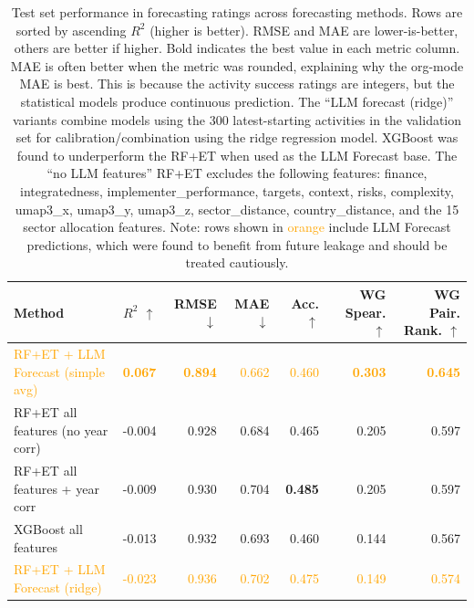 \documentclass[12pt,a4paper]{article}
\begin{document}
\begin{table}[t]
\centering
\small
\setlength{\tabcolsep}{6pt}
\renewcommand{\arraystretch}{1.15}

\caption{Test set performance in forecasting ratings across forecasting methods. Rows are sorted by ascending $R^2$ (higher is better). RMSE and MAE are lower-is-better, others are better if higher. Bold indicates the best value in each metric column. MAE is often better when the metric was rounded, explaining why the org-mode MAE is best. This is because the activity success ratings are integers, but the statistical models produce continuous prediction. The ``LLM forecast (ridge)'' variants combine models using the 300 latest-starting activities in the validation set for calibration/combination using the ridge regression model. XGBoost was found to underperform the RF+ET when used as the LLM Forecast base. The ``no LLM features'' RF+ET excludes the following features: finance, integratedness, implementer\_performance, targets, context, risks, complexity, umap3\_x, umap3\_y, umap3\_z, sector\_distance, country\_distance, and the 15 sector allocation features. Note: rows shown in \textcolor{orange}{orange} include LLM Forecast predictions, which were found to benefit from future leakage and should be treated cautiously.}
\label{tab:method_comparison_test_set_overall_ratings}
\begin{tabular}{p{3cm}rrrrrr}
\toprule
Method & $R^2$ $\uparrow$ & RMSE $\downarrow$ & MAE $\downarrow$ & Acc. $\uparrow$ & WG Spear. $\uparrow$ & WG Pair. Rank. $\uparrow$ \\
\midrule
\textcolor{orange}{RF+ET + LLM Forecast (simple avg)} & \textcolor{orange}{\textbf{0.067}} & \textcolor{orange}{\textbf{0.894}} & \textcolor{orange}{0.662} & \textcolor{orange}{0.460} & \textcolor{orange}{\textbf{0.303}} & \textcolor{orange}{\textbf{0.645}} \\[3pt]
RF+ET all features (no year corr) & -0.004 & 0.928 & 0.684 & 0.465 & 0.205 & 0.597 \\[3pt]
RF+ET all features + year corr & -0.009 & 0.930 & 0.704 & \textbf{0.485} & 0.205 & 0.597 \\[3pt]
XGBoost all features & -0.013 & 0.932 & 0.693 & 0.460 & 0.144 & 0.567 \\[3pt]
\textcolor{orange}{RF+ET + LLM Forecast (ridge)} & \textcolor{orange}{-0.023} & \textcolor{orange}{0.936} & \textcolor{orange}{0.702} & \textcolor{orange}{0.475} & \textcolor{orange}{0.149} & \textcolor{orange}{0.574} \\[3pt]

\end{tabular}
\end{table}
\end{document}
